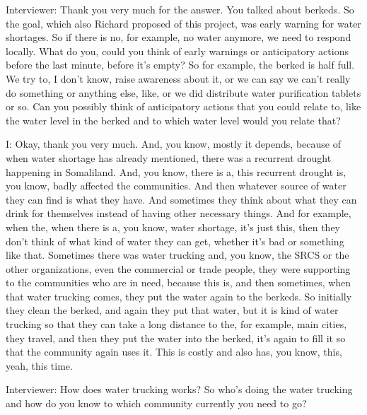 Interviewer:   Thank you very much for the answer. You talked about berkeds. So the goal, which also Richard proposed of this project, was early warning for water shortages. So if there is no, for example, no water anymore, we need to respond locally. What do you, could you think of early warnings or anticipatory actions before the last minute, before it's empty? So for example, the berked is half full. We try to, I don't know, raise awareness about it, or we can say we can't really do something or anything else, like, or we did distribute water purification tablets or so. Can you possibly think of anticipatory actions that you could relate to, like the water level in the berked and to which water level would you relate that? 

I: Okay, thank you very much. And, you know, mostly it depends, because of when water shortage has already mentioned, there was a recurrent drought happening in Somaliland. And, you know, there is a, this recurrent drought is, you know, badly affected the communities. And then whatever source of water they can find is what they have. And sometimes they think about what they can drink for themselves instead of having other necessary things. And for example, when the, when there is a, you know, water shortage, it's just this, then they don't think of what kind of water they can get, whether it's bad or something like that. Sometimes there was water trucking and, you know, the SRCS or the other organizations, even the commercial or trade people, they were supporting to the communities who are in need, because this is, and then sometimes, when that water trucking comes, they put the water again to the berkeds. So initially they clean the berked, and again they put that water, but it is kind of water trucking so that they can take a long distance to the, for example, main cities, they travel, and then they put the water into the berked, it's again to fill it so that the community again uses it. This is costly and also has, you know, this, yeah, this time. 

Interviewer:  How does water trucking works? So who's doing the water trucking and how do you know to which community currently you need to go? 

